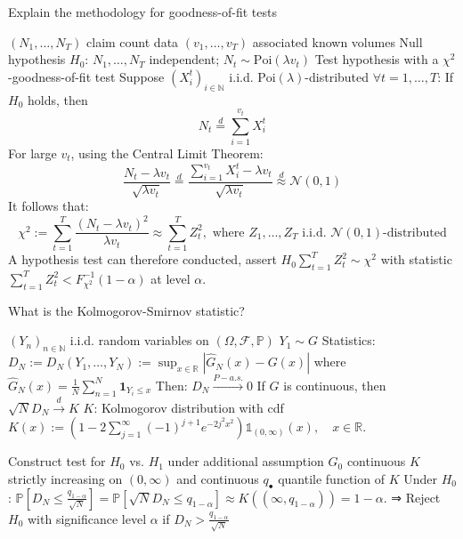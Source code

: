 Explain the methodology for goodness-of-fit tests

\( (N_1, \dots, N_T) \) claim count data
\( (v_1, \dots, v_T) \) associated known volumes
Null hypothesis \( H_0 \): \( N_1, \dots, N_T \) independent; \( N_t \sim \text{Poi}(\lambda v_t) \)
Test hypothesis with a \( \chi^2 \)-goodness-of-fit test
Suppose \( (X_i^t)_{i \in \mathbb{N}} \) i.i.d. \( \text{Poi}(\lambda) \)-distributed
\( \forall t = 1, \dots, T \): If \( H_0 \) holds, then
\[
N_t \overset{d}{=} \sum_{i=1}^{v_t} X_i^t
\]
For large \( v_t \), using the Central Limit Theorem:
\[
\frac{N_t - \lambda v_t}{\sqrt{\lambda v_t}} \overset{d}{=} \frac{\sum_{i=1}^{v_t} X_i^t - \lambda v_t}{\sqrt{\lambda v_t}} \overset{d}{\approx} \mathcal{N}(0,1)
\]
It follows that:
\[
\chi^2 := \sum_{t=1}^{T} \frac{(N_t - \lambda v_t)^2}{\lambda v_t} \approx \sum_{t=1}^{T} Z_t^2, \text{ where } Z_1, \dots, Z_T \text{ i.i.d. } \mathcal{N}(0,1) \text{-distributed}
\]
A hypothesis test can therefore conducted, assert \( H_0 \sum_{t=1}^{T} Z_t^2 \sim \chi^2  \) with statistic \( \sum_{t=1}^{T} Z_t^2 < F^{-1}_{\chi^2}(1 - \alpha) \) at level \( \alpha \).



What is the Kolmogorov-Smirnov statistic?

\((Y_n)_{n \in \mathbb{N}}\) i.i.d. random variables on \((\Omega, \mathcal{F}, \mathbb{P})\)
\(Y_1 \sim G\)
Statistics: \(D_N := D_N(Y_1, \dots, Y_N) := \sup_{x \in \mathbb{R}} |\hat{G}_N(x) - G(x)|\)
where \( \hat{G}_N(x) = \frac{1}{N}\sum_{n=1}^N \mathbf{1}_{Y_i \leq x} \)
Then: \(D_N \xrightarrow{P-a.s.} 0\)
If \(G\) is continuous, then \(\sqrt{N}D_N \xrightarrow{d} K\)
\(K\): Kolmogorov distribution with cdf \(K(x) := \left(1 - 2 \sum_{j=1}^\infty (-1)^{j+1} e^{-2j^2 x^2} \right) \mathbb{1}_{(0, \infty)}(x), \quad x \in \mathbb{R}\).

Construct test for \( H_0 \) vs. \( H_1 \) under additional assumption \( G_0 \) continuous
\( K \) strictly increasing on \( (0, \infty) \) and continuous
\( q_{\bullet} \) quantile function of \( K \) 
Under \( H_0 \):
\( \mathbb{P}[D_N \leq \frac{q_{1-\alpha}}{\sqrt{N}}] = \mathbb{P}[\sqrt{N}D_N \leq q_{1-\alpha}] \approx K((\infty, q_{1-\alpha})) = 1 - \alpha \).
⇒ Reject \( H_0 \) with significance level \( \alpha \) if \( D_N > \frac{q_{1-\alpha}}{\sqrt{N}} \)

